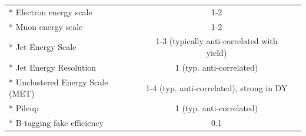 \begin{table}[htb]
{\begin{tabular}{lccccccc}
* Electron energy scale                        & \multicolumn{6}{c}{1-2}                                                      &           \\
* Muon energy scale                            & \multicolumn{6}{c}{1-2}                                                      &           \\
* Jet Energy Scale                             & \multicolumn{6}{c}{1-3 (typically anti-correlated with yield)}               &           \\
* Jet Energy Resolution                        & \multicolumn{6}{c}{1 (typ. anti-correlated)}                                 &           \\
* Unclustered Energy Scale (MET)               & \multicolumn{6}{c}{1-4 (typ. anti-correlated), strong in DY}                 &           \\
* Pileup                                       & \multicolumn{6}{c}{1 (typ. anti-correlated)}                                 &           \\
* B-tagging fake efficiency                    & \multicolumn{6}{c}{0.1}                                                      &           \\
\hline
\end{tabular}
}
\end{table}


